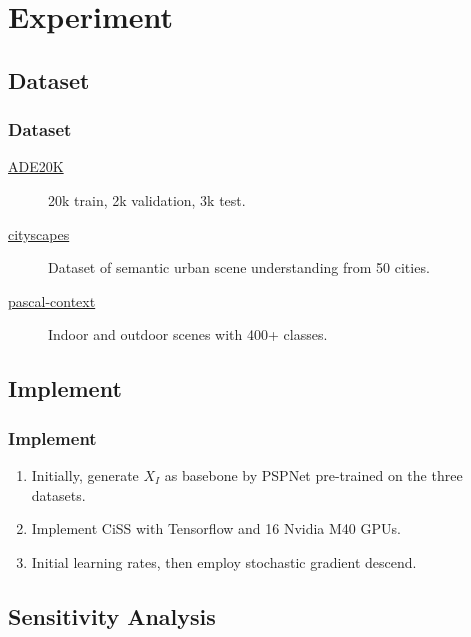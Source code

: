 \documentclass[12pt, aspectratio = 169, xcolor = x11names]{beamer}
\begin{document}
\section{Experiment}%
\label{sec:experiment}

\subsection{Dataset}%
\label{sub:dataset}

\begin{frame}
  \frametitle{Dataset}
  \begin{description}
    \item[\href{http://groups.csail.mit.edu/vision/datasets/ADE20K/}{ADE20K}]20k train, 2k validation, 3k test.
    \item[\href{https://www.cityscapes-dataset.com/}{cityscapes}]Dataset of semantic urban scene understanding from 50 cities.
    \item[\href{https://www.cs.stanford.edu/~roozbeh/pascal-context/}{pascal-context}]Indoor and outdoor scenes with 400+ classes.
  \end{description}
\end{frame}

\subsection{Implement}%
\label{sub:implement}

\begin{frame}
  \frametitle{Implement}
  \begin{enumerate}[<+->]
    \item Initially, generate $X_I$ as basebone by PSPNet pre-trained on the
      three datasets.
    \item Implement CiSS with Tensorflow and 16 Nvidia M40 GPUs.
    \item Initial learning rates, then employ stochastic gradient descend.
  \end{enumerate}
\end{frame}

\subsection{Sensitivity Analysis}%
\label{sub:sensitivity_analysis}
\end{document}
